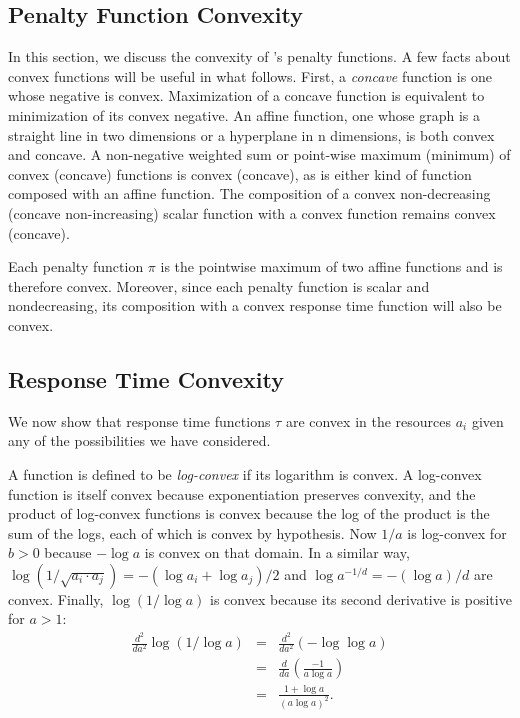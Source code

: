 \subsection{Penalty Function Convexity}
In this section, we discuss the convexity of \pacora's penalty functions.
A few facts about convex functions will be useful in what follows.
First, a \emph{concave} function is one whose negative is convex.
Maximization of a concave function is equivalent to minimization of its convex negative.
An affine function, one whose graph is a straight line in two dimensions or a hyperplane in n dimensions,
is both convex and concave.  A non-negative weighted sum or point-wise maximum (minimum) of convex (concave) functions is convex (concave), as is either kind of function composed with an affine function.  The composition of a convex non-decreasing (concave non-increasing) scalar function with a convex function remains convex (concave).

Each penalty function $\pi$ is the pointwise maximum of two affine functions and is therefore convex.
Moreover, since each penalty function is scalar and nondecreasing,
its composition with a convex response time function will also be convex.

\subsection{Response Time Convexity}
We now show that response time functions $\tau$ are convex
in the resources $a_i$ given any of the possibilities we have considered.

A function is defined to be \emph{log-convex} if its logarithm is convex.
A log-convex function is itself convex because exponentiation preserves convexity,
and the product of log-convex functions is convex because the log of the product is the sum of the logs,
each of which is convex by hypothesis.
Now $1/a$ is log-convex for $b > 0$ because $-\log a$ is convex on that domain.
In a similar way, $\log(1/\sqrt{a_i\cdot a_j}) = -(\log a_i + \log a_j)/2$
and $\log a^{-1/d} = -(\log a)/d$ are convex.
Finally, $\log (1/\log a)$ is convex because its second derivative is positive for $a > 1$:
\begin{eqnarray*}
\frac{d^2}{da^2}\log (1/\log a) &=& \frac{d^2}{da^2}(-\log\log a)  \\
                                  &=& \frac{d}{da}\left(\frac{-1}{a\log a}\right) \\
                                  &=& \frac{1 + \log a}{(a\log a)^2}.
\end{eqnarray*}

